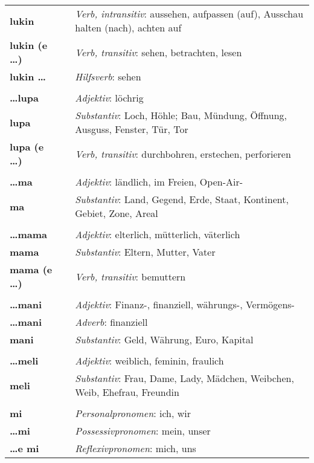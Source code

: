 \begin{supertabular}{p{2,5cm}|ll}
\textbf{lukin} && \textit{Verb, intransitiv}: aussehen, aufpassen (auf), Ausschau halten (nach), achten auf \\ 
\textbf{lukin (e \dots)} && \textit{Verb, transitiv}: sehen, betrachten, lesen \\ 
\textbf{lukin \dots} && \textit{Hilfsverb}: sehen \\ 
 && \\ %
\textbf{\dots lupa} && \textit{Adjektiv}: löchrig \\
\textbf{lupa} && \textit{Substantiv}: Loch, Höhle; Bau, Mündung, Öffnung, Ausguss, Fenster, Tür, Tor \\ 
\textbf{lupa (e \dots)} && \textit{Verb, transitiv}: durchbohren, erstechen, perforieren \\ 
 && \\ %
\textbf{\dots ma} && \textit{Adjektiv}: ländlich, im Freien, Open-Air- \\ 
\textbf{ma} && \textit{Substantiv}: Land, Gegend, Erde, Staat, Kontinent, Gebiet, Zone, Areal \\ 
 && \\ %
\textbf{\dots mama} && \textit{Adjektiv}: elterlich, mütterlich, väterlich \\ 
\textbf{mama} && \textit{Substantiv}: Eltern, Mutter, Vater \\ 
\textbf{mama (e \dots)} && \textit{Verb, transitiv}: bemuttern \\ 
 && \\ %
\textbf{\dots mani} && \textit{Adjektiv}: Finanz-, finanziell, währungs-, Vermögens- \\ 
\textbf{\dots mani} && \textit{Adverb}: finanziell \\ 
\textbf{mani} && \textit{Substantiv}: Geld, Währung, Euro, Kapital \\ 
 && \\ %
\textbf{\dots meli} && \textit{Adjektiv}: weiblich, feminin, fraulich \\ 
\textbf{meli} && \textit{Substantiv}: Frau, Dame, Lady, Mädchen, Weibchen, Weib, Ehefrau, Freundin \\ 
 && \\ %
\textbf{mi} && \textit{Personalpronomen}: ich, wir  \\ 
\textbf{\dots mi} && \textit{Possessivpronomen}: mein, unser \\  
\textbf{\dots e mi} && \textit{Reflexivpronomen}: mich, uns  \\ 

\end{supertabular}
